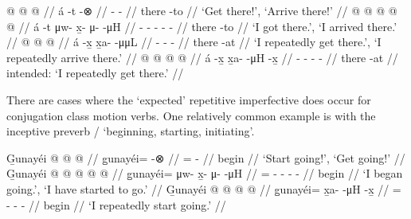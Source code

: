 \documentclass[12pt,letterpaper,oneside,article]{memoir}
\begin{document}
\pex\label{ex:motpos-motrep-telic}%
\a\label{ex:motpos-motrep-telic-imp}%
%
\begingl
	\gla	{} @ {}  @ {} @ {} //
	\glb	á -t {}  -⊗ //
	\glc	{} - \·  - //
	\gld	there -to  {} {} //
	\glft	‘Get there!’, ‘Arrive there!’
		//
\endgl
\a\label{ex:motpos-motrep-telic-pfv}%
%
\begingl
	\gla	{} @ {}  @ {} @ {} @ {} @ {} //
	\glb	á -t μw- x̱- μ-  -μH //
	\glc	{} - - - -  - //
	\gld	there -to  {} {} {} {} //
	\glft	‘I got there.’, ‘I arrived there.’
		//
\endgl
\a\label{ex:motpos-motrep-telic-repch}%
%
\begingl
	\gla	{} @ {}  @ {} @ {} //
	\glb	á -x̱ x̱a-  -μμL //
	\glc	{} - -  - //
	\gld	there -at  {} {} //
	\glft	‘I repeatedly get there.’, ‘I repeatedly arrive there.’
		//
\endgl
\a\label{ex:motpos-motrep-telic-repxh}%
\ljudge{*}%
%
\begingl
	\gla	{} @ {}  @ {} @ {} @ {} //
	\glb	á -x̱ x̱a-  -μH -x̱ //
	\glc	{} - -  - - //
	\gld	there -at  {} {} {} //
	\glft	intended: ‘I repeatedly get there.’
		//
\endgl
\xe

There are cases where the ‘expected’  repetitive imperfective does occur for  conjugation class motion verbs.
One relatively common example is with the inceptive preverb  /  ‘beginning, starting, initiating’.

\pex\label{ex:motpos-motrep-incep}%
\a\label{ex:motpos-motrep-incep-imp}%
%
\begingl
	\gla	G̱unayéi @  @ {} @ {} //
	\glb	g̱unayéi= {}  -⊗ //
	\glc	{}= \·  - //
	\gld	begin\•  {} {} //
	\glft	‘Start going!’, ‘Get going!’
		//
\endgl
\a\label{ex:motpos-motrep-incep-pfv}%
%
\begingl
	\gla	G̱unayéi @  @ {} @ {} @ {} @ {} //
	\glb	g̱unayéi= μw- x̱- μ-  -μH //
	\glc	{}= - - -  - //
	\gld	begin\•  {} {} {} {} //
	\glft	‘I began going.’, ‘I have started to go.’
		//
\endgl
\a\label{ex:motpos-motrep-incep-repxh}%
%
\begingl
	\gla	G̱unayéi @  @ {} @ {} @ {} //
	\glb	g̱unayéi= x̱a-  -μH -x̱ //
	\glc	{}= -  - - //
	\gld	begin\•  {} {} {} //
	\glft	‘I repeatedly start going.’
		//
\endgl
\xe
\end{document}
